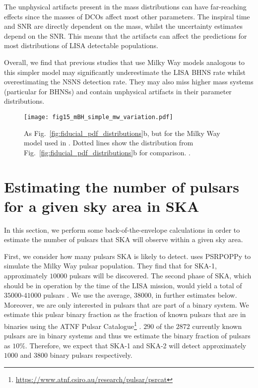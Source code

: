 The unphysical artifacts present in the mass distributions can have far-reaching effects since the masses of DCOs affect most other parameters. The inspiral time and SNR are directly dependent on the mass, whilst the uncertainty estimates depend on the SNR. This means that the artifacts can affect the predictions for most distributions of LISA detectable populations.

Overall, we find that previous studies that use Milky Way models analogous to this simpler model may significantly underestimate the LISA BHNS rate whilst overestimating the NSNS detection rate. They may also miss higher mass systems (particular for BHNSs) and contain unphysical artifacts in their parameter distributions.

\begin{figure}[htb]
    \centering
    \texttt{[image: fig15\_mBH\_simple\_mw\_variation.pdf]}
    \caption{As Fig.~\ref{fig:fiducial_pdf_distributions}b, but for the Milky Way model used in \citet{Breivik+2020}. Dotted lines show the distribution from Fig.~\ref{fig:fiducial_pdf_distributions}b for comparison. \href{https://github.com/TomWagg/detecting-DCOs-in-LISA/blob/main/paper/figures/fig15_mBH_simple_mw_variation.pdf}{\faFileImage} \href{https://github.com/TomWagg/detecting-DCOs-in-LISA/blob/main/paper/figure_notebooks/fiducial.ipynb}{\faBook}.}
    \label{fig:bh_mass_simple_mw}
\end{figure}

\section{Estimating the number of pulsars for a given sky area in SKA}\label{app:ska_area}

In this section, we perform some back-of-the-envelope calculations in order to estimate the number of pulsars that SKA will observe within a given sky area.

First, we consider how many pulsars SKA is likely to detect. \citet{Keane+2015} uses PSRPOPPy \citep{Bates+2014} to simulate the Milky Way pulsar population. They find that for SKA-1, approximately $10000$ pulsars will be discovered. The second phase of SKA, which should be in operation by the time of the LISA mission, would yield a total of $35000$-$41000$ pulsars \citep{Keane+2015}. We use the average, $38000$, in further estimates below. Moreover, we are only interested in pulsars that are part of a binary system. We estimate this pulsar binary fraction as the fraction of known pulsars that are in binaries using the ATNF Pulsar Catalogue\footnote{\url{https://www.atnf.csiro.au/research/pulsar/psrcat}} \citep{Manchester+2005}. $290$ of the $2872$ currently known pulsars are in binary systems and thus we estimate the binary fraction of pulsars as $10\%$. Therefore, we expect that SKA-1 and SKA-2 will detect approximately $1000$ and $3800$ binary pulsars respectively.

